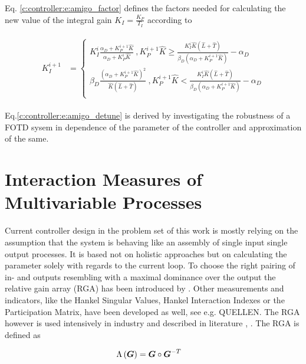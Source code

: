 Eq. \ref{c:controller:e:amigo_factor} defines the factors needed for calculating the new value of the integral gain $K_I = \frac{K_P}{T_I}$ according to

\begin{align}
\begin{split}
K_I^{i+1} &= \begin{cases}
	K_I^i \frac{\alpha_D + K_P^{i+1} \hat{K}}{\alpha_D + K_P^{i} \hat{K}} ~, K_P^{i+1} \hat{K} \geq \frac{K_I^{i}\hat{K}\left(\hat{L}+\hat{T}\right)}{\beta_D \left( \alpha_D + K_P^{i+1} \hat{K}\right)} - \alpha_D\\
	\beta_D \frac{\left( \alpha_D + K_P^{i+1} \hat{K} \right)^2}{\hat{K} \left( \hat{L}+ \hat{T} \right)}~, K_P^{i+1} \hat{K} < \frac{K_I^{i}\hat{K}\left(\hat{L}+\hat{T}\right)}{\beta_D \left( \alpha_D + K_P^{i+1} \hat{K}\right)} - \alpha_D\\
\end{cases}
\end{split}
\label{c:controller:e:amigo_detune}
\end{align} 

Eq.\ref{c:controller:e:amigo_detune} is derived by investigating the robustness of a FOTD sysem in dependence of the parameter of the controller and approximation of the same.\\

\section{Interaction Measures of Multivariable Processes} %
\label{c:controller:s:rga}

Current controller design in the problem set of this work is mostly relying on the assumption that the system is behaving like an assembly of single input single output processes. It is based not on holistic approaches but on calculating the parameter solely with regards to the current loop. To choose the right pairing of in- and outputs resembling with a maximal dominance over the output the relative gain array (RGA) has been introduced by \cite{Bristol1966}. Other measurements and indicators, like the Hankel Singular Values, Hankel Interaction Indexes or the Participation Matrix, have been developed as well, see e.g. QUELLEN. The RGA however is used intensively in industry and described in literature \cite[p. 88 ff.]{Skogestad2005}, \cite[p.219 ff.]{Glad2000}. The RGA is defined as

\begin{align}
\begin{split}
\Lambda\left(\mbox{\boldmath$G$}\right) &= \mbox{\boldmath$G$} \circ \mbox{\boldmath$G$}^{-T}
\end{split}
\label{c:controller:e:rga}
\end{align}

